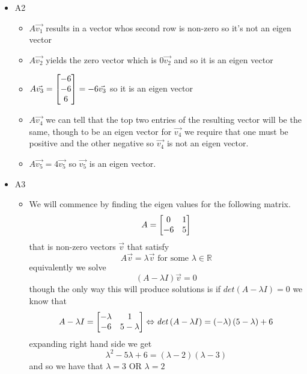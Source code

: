 \documentclass[11pt]{book}
\begin{document}
\begin{itemize}
    \item A2
        \begin{itemize}
            \item $A\vec{v_1} $ results in a vector whos second row is non-zero so it's not an eigen vector
            \item $A\vec{v_2} $ yields the zero vector which is $0 \vec{v_2} $ and so it is an eigen vector
            \item $A\vec{v_3} = \begin{bmatrix} -6 \\ -6 \\ 6 \end{bmatrix} = -6\vec{v_3} $ so it is an eigen vector
            \item $A\vec{v_4}$ we can tell that the top two entries of the resulting vector will be the same, though to be an eigen vector for $\vec{v_4} $ we require that one must be positive and the other negative so $\vec{v_4} $   is not an eigen vector. 
            \item $A\vec{v_5} = 4\vec{v_{5}} $ so $\vec{v_5} $ is an eigen vector. 
        \end{itemize}
    \item A3
        \begin{itemize}
            \item We will commence by finding the eigen values for the following matrix.
                \[
                A = \begin{bmatrix} 0 & 1 \\ -6 & 5 \end{bmatrix}
                \]
                that is non-zero vectors $\vec{v} $ that satisfy 
                \[
                A\vec{v} = \lambda \vec{v} \text{ for some } \lambda \in \mathbb{R}     
                \]
                equivalently we solve 
                \[
                    \left( A - \lambda I \right) \vec{v} = 0
                \]
                though the only way this will produce solutions is if $\mathit{det} \left(A - \lambda I\right) = 0$ we know that 
                \[
                    A - \lambda I= \begin{bmatrix}  - \lambda  & 1 \\ -6 & 5 - \lambda  \end{bmatrix} \Leftrightarrow \mathit{det} \left(A - \lambda I\right) = \left(  - \lambda  \right) \left( 5 - \lambda  \right)   + 6
                \]
                expanding right hand side we get
                \[
                    \lambda ^2  - 5\lambda  + 6= \left( \lambda -2 \right) \left( \lambda  - 3 \right) 
                \]
                and so we have that $\lambda = 3 $ OR $\lambda = 2$ 
                \begin{itemize}

\end{itemize}
\end{itemize}
\end{itemize}
\end{document}
